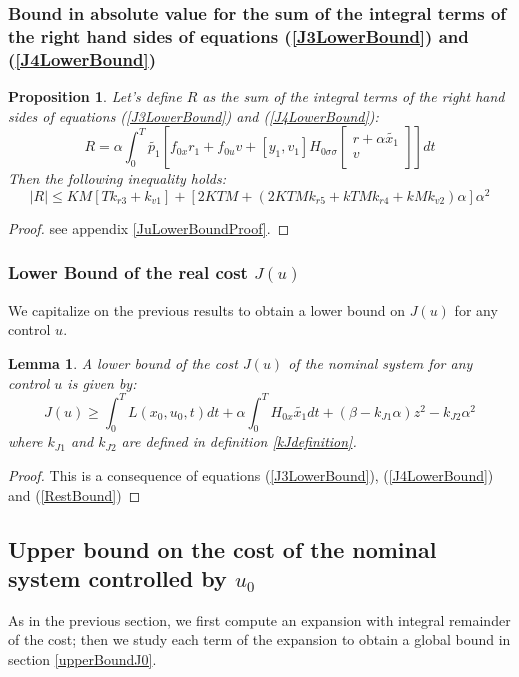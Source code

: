 \documentclass[a4paper,10pt]{article}
\newtheorem{proposition}{Proposition}
\newtheorem{lemm}{Lemma}
\begin{document}
\subsubsection{Bound in absolute value for the sum of the integral 
terms of the right hand sides of equations (\ref{J3LowerBound}) and 
(\ref{J4LowerBound})}
\begin{proposition}
    Let's define $R$ as the sum of the integral 
terms of the right hand sides of equations (\ref{J3LowerBound}) and 
(\ref{J4LowerBound}):
\[
    R = \alpha \int_{0}^{T} \tilde{p_{1}}
    \left[f_{0x}r_{1} + f_{0u}v
    + \left[y_{1},v_{1}\right]
	H_{0 \sigma \sigma}
	\left[
	\begin{array}
	{c}
	    r+\alpha\tilde{x_{1}}  \\
	    v  \\
	\end{array}
	\right]\right] dt
\]
Then the following inequality holds:
\begin{equation}
    |R| \leq KM[Tk_{r3} + k_{v1}]
    + [2KTM + (2KTMk_{r5} + kTMk_{r4} + kMk_{v2})\alpha]\alpha^{2}
    \label{RestBound}
\end{equation}
\end{proposition}
\begin{proof}
    see appendix \ref{JuLowerBoundProof}.
\end{proof}


\subsubsection{Lower Bound of the real cost $J(u)$}
We capitalize on the previous results to obtain a lower bound on $J(u)$ 
for any control $u$.
\begin{lemm}\label{JuLowerBoundLemma}
   A lower bound of the cost $J(u)$ of the nominal system for any 
   control $u$ is given by:
   \begin{equation}
       J(u) \geq \int_{0}^{T} L(x_{0},u_{0},t) dt
	+ \alpha \int_{0}^{T} H_{0x} \tilde{x_{1}} dt
	+(\beta - k_{J1}\alpha)z^{2}
	- k_{J2}\alpha^{2}
        \label{JuLowerBound}
   \end{equation}
	where $k_{J1}$ and $k_{J2}$ are defined in definition 
	\ref{kJdefinition}.
\end{lemm}
\begin{proof}
    This is a consequence of equations (\ref{J3LowerBound}), 
    (\ref{J4LowerBound}) and (\ref{RestBound})
\end{proof}


\subsection{Upper bound on the cost of the nominal system controlled 
by $u_{0}$}\label{Ju0UppererBoundSection}
As in the previous section, we first compute an expansion with 
integral remainder of the cost; then we study each term of the 
expansion to obtain a global bound in section \ref{upperBoundJ0}.
\end{document}
